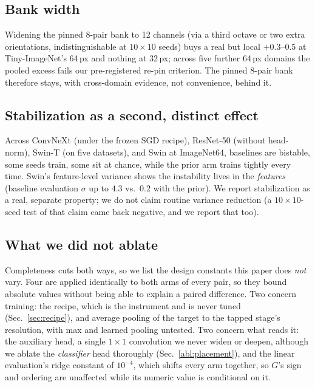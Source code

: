\subsection{Bank width}\label{abl:width}
Widening the pinned 8-pair bank to 12 channels (via a third octave or two extra
orientations, indistinguishable at $10{\times}10$ seeds) buys a real but local
$+0.3$--$0.5$ at Tiny-ImageNet's 64\,px and nothing at 32\,px; across five
further 64\,px domains the pooled excess fails our pre-registered re-pin
criterion. The pinned 8-pair bank therefore stays, with cross-domain evidence,
not convenience, behind it.

\subsection{Stabilization as a second, distinct effect}\label{abl:stab}
Across ConvNeXt (under the frozen SGD recipe), ResNet-50 (without head-norm),
Swin-T (on five datasets), and Swin at ImageNet64, baselines are bistable, some
seeds train, some sit at chance, while the prior arm trains tightly every time.
Swin's feature-level variance shows the instability lives in the
\emph{features} (baseline evaluation $\sigma$ up to $4.3$ vs.\ $0.2$ with the
prior). We report stabilization as a real, separate property; we do not claim
routine variance reduction (a $10{\times}10$-seed test of that claim came back
negative, and we report that too).

\subsection{What we did not ablate}\label{abl:notablated}
Completeness cuts both ways, so we list the design constants this paper does
\emph{not} vary. Four are applied identically to both arms of every pair, so
they bound absolute values without being able to explain a paired difference.
Two concern training: the recipe, which is the instrument and is never tuned
(Sec.~\ref{sec:recipe}), and average pooling of the target to the tapped
stage's resolution, with max and learned pooling untested. Two concern what
reads it: the auxiliary head, a single $1{\times}1$ convolution we never widen
or deepen, although we ablate the \emph{classifier} head thoroughly
(Sec.~\ref{abl:placement}), and the linear evaluation's ridge constant of
$10^{-4}$, which shifts every arm together, so $G$'s sign and ordering are
unaffected while its numeric value is conditional on it.

